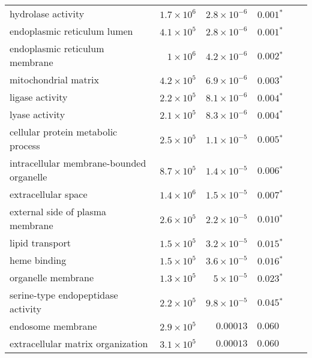 \documentclass{article}
\begin{document}
\begin{longtable}{|l|r|r|r|r|r|}
                        hydrolase activity & $1.7\times 10^{6}$ &  $2.8\times 10^{-6}$ &              $\bm{ 0.001{^*}}$ \\
               endoplasmic reticulum lumen & $4.1\times 10^{5}$ &  $2.8\times 10^{-6}$ &              $\bm{ 0.001{^*}}$ \\
            endoplasmic reticulum membrane &  $ 1\times 10^{6}$ &  $4.2\times 10^{-6}$ &              $\bm{ 0.002{^*}}$ \\
                      mitochondrial matrix & $4.2\times 10^{5}$ &  $6.9\times 10^{-6}$ &              $\bm{ 0.003{^*}}$ \\
                           ligase activity & $2.2\times 10^{5}$ &  $8.1\times 10^{-6}$ &              $\bm{ 0.004{^*}}$ \\
                            lyase activity & $2.1\times 10^{5}$ &  $8.3\times 10^{-6}$ &              $\bm{ 0.004{^*}}$ \\
        cellular protein metabolic process & $2.5\times 10^{5}$ &  $1.1\times 10^{-5}$ &              $\bm{ 0.005{^*}}$ \\
  intracellular membrane-bounded organelle & $8.7\times 10^{5}$ &  $1.4\times 10^{-5}$ &              $\bm{ 0.006{^*}}$ \\
                       extracellular space & $1.4\times 10^{6}$ &  $1.5\times 10^{-5}$ &              $\bm{ 0.007{^*}}$ \\
          external side of plasma membrane & $2.6\times 10^{5}$ &  $2.2\times 10^{-5}$ &              $\bm{ 0.010{^*}}$ \\
                           lipid transport & $1.5\times 10^{5}$ &  $3.2\times 10^{-5}$ &              $\bm{ 0.015{^*}}$ \\
                              heme binding & $1.5\times 10^{5}$ &  $3.6\times 10^{-5}$ &              $\bm{ 0.016{^*}}$ \\
                        organelle membrane & $1.3\times 10^{5}$ &   $ 5\times 10^{-5}$ &              $\bm{ 0.023{^*}}$ \\
        serine-type endopeptidase activity & $2.2\times 10^{5}$ &  $9.8\times 10^{-5}$ &              $\bm{ 0.045{^*}}$ \\
                         endosome membrane & $2.9\times 10^{5}$ &            $0.00013$ &                     $ 0.060~~$ \\
         extracellular matrix organization & $3.1\times 10^{5}$ &            $0.00013$ &                     $ 0.060~~$ \\

\end{longtable}
\end{document}
